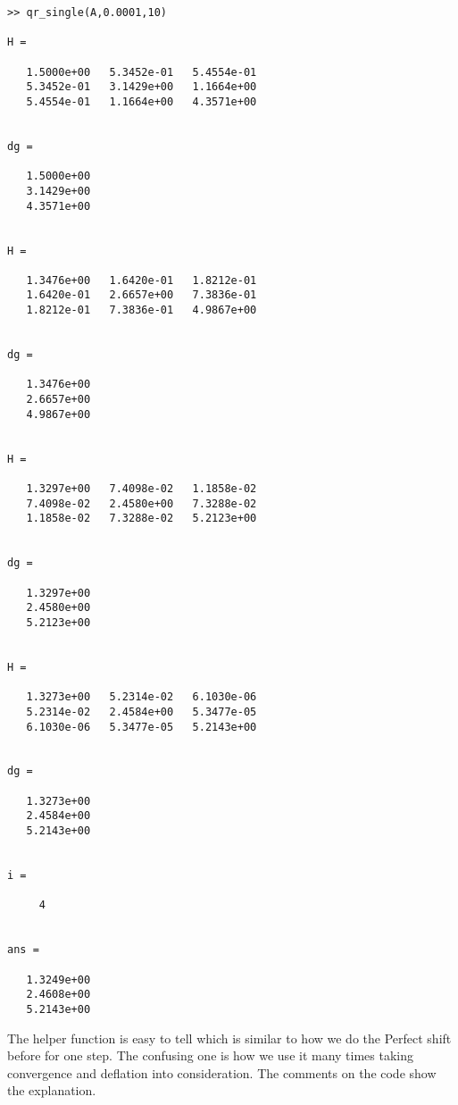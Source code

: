 \begin{verbatim}
>> qr_single(A,0.0001,10)

H =

   1.5000e+00   5.3452e-01   5.4554e-01
   5.3452e-01   3.1429e+00   1.1664e+00
   5.4554e-01   1.1664e+00   4.3571e+00


dg =

   1.5000e+00
   3.1429e+00
   4.3571e+00


H =

   1.3476e+00   1.6420e-01   1.8212e-01
   1.6420e-01   2.6657e+00   7.3836e-01
   1.8212e-01   7.3836e-01   4.9867e+00


dg =

   1.3476e+00
   2.6657e+00
   4.9867e+00


H =

   1.3297e+00   7.4098e-02   1.1858e-02
   7.4098e-02   2.4580e+00   7.3288e-02
   1.1858e-02   7.3288e-02   5.2123e+00


dg =

   1.3297e+00
   2.4580e+00
   5.2123e+00


H =

   1.3273e+00   5.2314e-02   6.1030e-06
   5.2314e-02   2.4584e+00   5.3477e-05
   6.1030e-06   5.3477e-05   5.2143e+00


dg =

   1.3273e+00
   2.4584e+00
   5.2143e+00


i =

     4


ans =

   1.3249e+00
   2.4608e+00
   5.2143e+00
\end{verbatim}
The helper function is easy to tell which is similar to how we do the Perfect shift before for one step. The confusing one is how we use it many times taking convergence and deflation into consideration. The comments on the code show the explanation.

